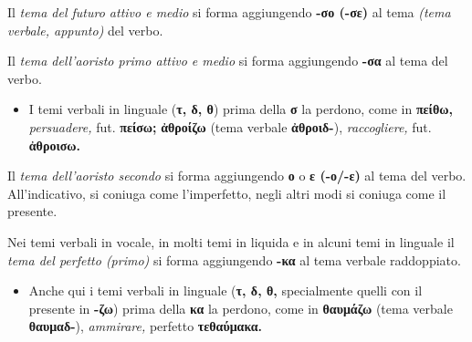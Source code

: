 \documentclass[nols]{tufte-handout}
\newcommand{\textls}[2][5]{%
    \begingroup\addfontfeatures{LetterSpace=#1}#2\endgroup
  }
\renewcommand{\smallcapsspacing}[1]{\textls[10]{#1}}
\renewcommand{\textsc}[1]{\smallcapsspacing{\textsmallcaps{#1}}}
\begin{document}
 Il \textit{tema del futuro attivo e medio} si forma aggiungendo \textbf{-σο (-σε)} al tema \textit{(tema verbale, appunto)} del verbo. 

 Il \textit{tema dell'aoristo primo attivo e medio} si forma aggiungendo \textbf{-σα} al tema del verbo.

\begin{itemize}
\item[\textsc{a.}] I temi verbali in linguale (\textbf{τ, δ, θ}) prima della \textbf{σ} la perdono, come in \textbf{πείθω,} \textit{persuadere,} fut. \textbf{πείσω;} \textbf{ἀθροίζω} (tema verbale \textbf{ἀθροιδ-}), \textit{raccogliere,} fut. \textbf{ἀθροισω.} 
\end{itemize}

 Il \textit{tema dell'aoristo secondo} si forma aggiungendo \textbf{ο} o \textbf{ε (-ο/-ε)} al tema del verbo. All'indicativo, si coniuga come l'imperfetto, negli altri modi si coniuga come il presente. 

 Nei temi verbali in vocale, in molti temi in liquida e in alcuni temi in linguale il \textit{tema del perfetto (primo)} si forma aggiungendo \textbf{-κα} al tema verbale raddoppiato.


\begin{itemize}
\item[\textsc{1.}] Anche qui i temi verbali in linguale (\textbf{τ, δ, θ,} specialmente quelli con il presente in \textbf{-ζω}) prima della \textbf{κα} la perdono, come in \textbf{θαυμάζω} (tema verbale \textbf{θαυμαδ-}), \textit{ammirare,} perfetto \textbf{τεθαύμακα.}
\end{itemize}
\end{document}
